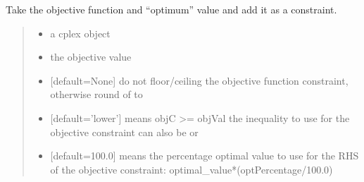 \documentclass[letterpaper,12pt,english]{sphinxmanual}
\begin{document}
\begin{fulllineitems}
\label{\detokenize{api/solvers:cbmpy.CBGLPK.glpk_func_SetObjectiveFunctionAsConstraint}}
\pysigstartsignatures
\pysiglinewithargsret
{}
{\sphinxparamcomma {}\sphinxparamcomma {}\sphinxparamcomma {}\sphinxparamcomma {}}
{}
\pysigstopsignatures
\sphinxAtStartPar
Take the objective function and “optimum” value and add it as a constraint.
\begin{quote}\begin{description}
\begin{itemize}
\item {} 
\sphinxAtStartPar
{} \textendash{} a cplex object

\item {} 
\sphinxAtStartPar
{} \textendash{} the objective value

\item {} 
\sphinxAtStartPar
{} \textendash{} {[}default=None{]} do not floor/ceiling the objective function constraint, otherwise round of to 

\item {} 
\sphinxAtStartPar
{} \textendash{} {[}default=’lower’{]} means objC \textgreater{}= objVal the inequality to use for the objective constraint can also be  or 

\item {} 
\sphinxAtStartPar
{} \textendash{} {[}default=100.0{]} means the percentage optimal value to use for the RHS of the objective constraint: optimal\_value*(optPercentage/100.0)

\end{itemize}

\end{description}\end{quote}

\end{fulllineitems}

\end{document}
